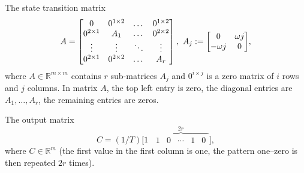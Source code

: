 \documentclass[letterpaper,10pt,journal,twoside]{IEEEtran}
\theoremstyle{definition}
\begin{document}
The state transition matrix
\begin{equation}\label{eq:mat_A}{\small
  A=\begin{bmatrix}
    0            & 0^{1\times 2}& \dots & 0^{1\times 2} \\
    0^{2\times 1}& A_1          & \dots & 0^{2\times 2} \\
    \vdots       & \vdots       & \ddots& \vdots        \\
    0^{2\times 1}& 0^{2\times 2}& \dots & A_r 
  \end{bmatrix},\,\,A_j:=\begin{bmatrix}0 & \omega j \\ -\omega j & 0\end{bmatrix}},
\end{equation}
where $A\in\mathbb{R}^{m\times m}$ contains $r$ sub-matrices $A_j$ and $0^{i\times j}$ is a zero matrix of $i$ rows and $j$ columns. In matrix $A$, the top left entry is zero, the diagonal entries are $A_1,\dots,A_r$, the remaining entries are zeros.

The output matrix\vspace*{-3ex}
\begin{equation}\label{eq:mat_C}
  C=(1/T)\Big[1 \,\,\, \overbrace{\begin{matrix}1 & 0 &\cdots & 1 & 0\end{matrix}}^{2r}\Big],
\end{equation}
where $C\in\mathbb{R}^m$ (the first value in the first column is one, the pattern one--zero is then repeated $2r$ times).


\end{document}
